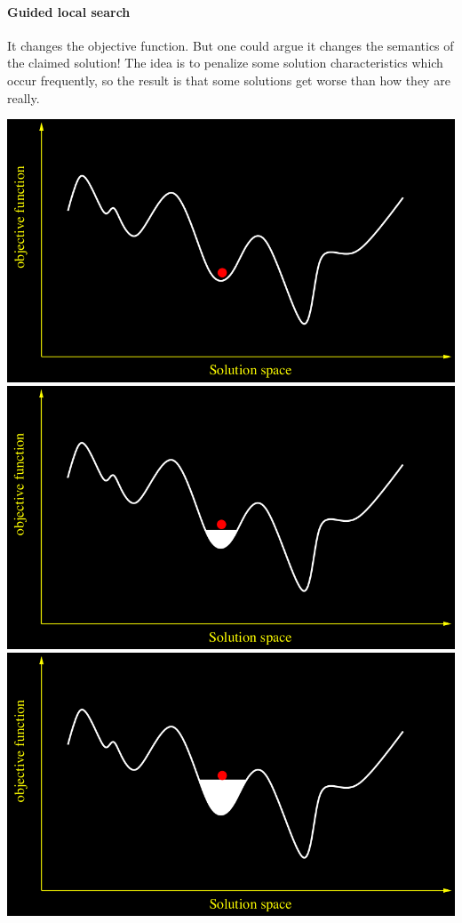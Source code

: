 \documentclass[10pt,a4paper]{article}
\begin{document}
\paragraph{Guided local search}
It changes the objective function. But one could argue it changes the semantics
of the claimed solution! The idea is to penalize some solution characteristics
which occur frequently, so the result is that some solutions get worse than how
they are really.

\includegraphics[scale=0.1]{guided-local-search1.png}
\includegraphics[scale=0.1]{guided-local-search2.png}
\includegraphics[scale=0.1]{guided-local-search3.png}
\end{document}
